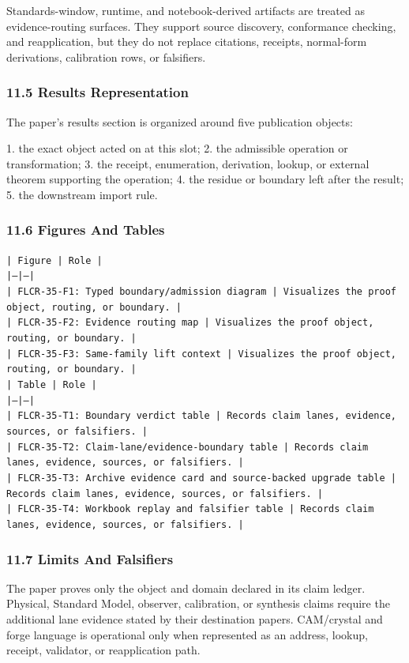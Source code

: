 \documentclass[11pt]{article}
\begin{document}
Standards-window, runtime, and notebook-derived artifacts are treated
as evidence-routing surfaces. They support source discovery, conformance
checking, and reapplication, but they do not replace citations, receipts,
normal-form derivations, calibration rows, or falsifiers.

\subsubsection*{11.5 Results Representation}

The paper's results section is organized around five publication objects:

1. the exact object acted on at this slot;
2. the admissible operation or transformation;
3. the receipt, enumeration, derivation, lookup, or external theorem supporting
   the operation;
4. the residue or boundary left after the result;
5. the downstream import rule.

\subsubsection*{11.6 Figures And Tables}

\noindent\texttt{| Figure | Role |}\\
\noindent\texttt{|---|---|}\\
\noindent\texttt{| FLCR-35-F1: Typed boundary/admission diagram | Visualizes the proof object, routing, or boundary. |}\\
\noindent\texttt{| FLCR-35-F2: Evidence routing map | Visualizes the proof object, routing, or boundary. |}\\
\noindent\texttt{| FLCR-35-F3: Same-family lift context | Visualizes the proof object, routing, or boundary. |}\\

\noindent\texttt{| Table | Role |}\\
\noindent\texttt{|---|---|}\\
\noindent\texttt{| FLCR-35-T1: Boundary verdict table | Records claim lanes, evidence, sources, or falsifiers. |}\\
\noindent\texttt{| FLCR-35-T2: Claim-lane/evidence-boundary table | Records claim lanes, evidence, sources, or falsifiers. |}\\
\noindent\texttt{| FLCR-35-T3: Archive evidence card and source-backed upgrade table | Records claim lanes, evidence, sources, or falsifiers. |}\\
\noindent\texttt{| FLCR-35-T4: Workbook replay and falsifier table | Records claim lanes, evidence, sources, or falsifiers. |}\\

\subsubsection*{11.7 Limits And Falsifiers}

The paper proves only the object and domain declared in its claim ledger.
Physical, Standard Model, observer, calibration, or synthesis claims require
the additional lane evidence stated by their destination papers. CAM/crystal
and forge language is operational only when represented as an address, lookup,
receipt, validator, or reapplication path.
\end{document}
